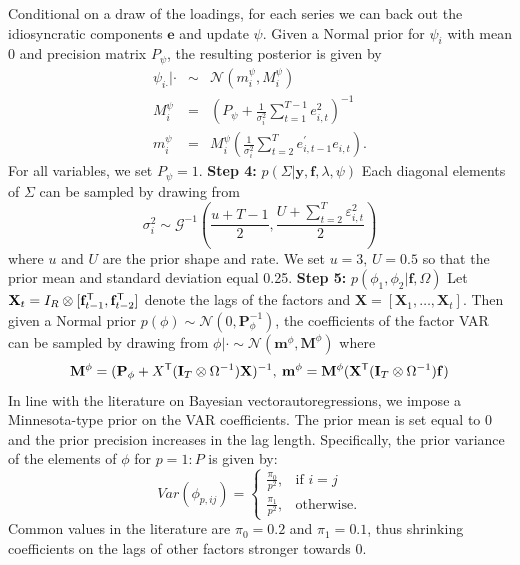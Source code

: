 \documentclass[notitlepage,a4paper,12pt]{article}
\begin{document}
\begin{ThreePartTable}
\newline       
 Conditional on a draw of the loadings, for each series we can back out the idiosyncratic components $\mathbf{e}$ and update $\psi$. Given a Normal prior for $\psi_i$ with mean 0 and precision matrix $P_{\psi}$, the resulting posterior is given by 
    \begin{eqnarray}\label{eq:posterior_psi}
        \psi_{i \boldsymbol{\cdot} } | \cdot &\sim& \mathcal{N}\left( m^{\psi}_i,M^{\psi}_i \right) \\
        M^{\psi}_i &=& \left( P_{\psi} +  \frac{1}{\sigma^2_i} \sum\nolimits_{t=1}^{T-1} e_{i, t}^2 \right)^{-1}\\
        m^{\psi}_i &=& M^{\psi}_i \left( \frac{1}{\sigma^2_i}\sum\nolimits_{t=2}^T e_{i, t-1}^{\prime} e_{i,t} \right).
    \end{eqnarray}
For all variables, we set $P_{\psi} = 1$.
\newline
\linebreak
\textbf{Step 4:} $p(\Sigma| \mathbf{y}, \mathbf{f}, \lambda, \psi)$
\newline       
Each diagonal elements of $\Sigma$ can be sampled by drawing from 
\begin{equation*}
\sigma^2_i \sim \mathcal{G}^{-1} \left( \frac{u + T-1}{2},\frac{U + \sum_{t=2}^T \varepsilon_{i,t}^2}{2} \right)
\end{equation*}  where $u$ and $U$ are the prior shape and rate. We set $u=3, \, U = 0.5$ so that the prior mean and standard deviation equal 0.25. 
\newline
\linebreak
\textbf{Step 5:} $p(\phi_1, \phi_2| \mathbf{f}, \Omega)$
\newline  
Let $\mathbf{X}_t = I_R \otimes [\mathbf{f}^{\sf{T}}_{t-1}, \mathbf{f}^{\sf{T}}_{t-2}]$ denote the lags of the factors and $\mathbf{X} = [\mathbf{X}_1, \dots, \mathbf{X}_t]$. Then given a Normal prior $p(\phi) \sim \mathcal{N}(0, \mathbf{P}_{\phi}^{-1})$, the coefficients of the factor VAR can be sampled by drawing from $\phi | \cdot \sim \mathcal{N}(\mathbf{m}^{\phi}, \mathbf{M}^{\phi})$ where
$$
\mathbf{M}^{\phi} = (\mathbf{P}_{\phi} + X^{\sf{T}}(\mathbf{I}_T \otimes \Omega^{-1})\mathbf{X})^{-1}, \: \mathbf{m}^{\phi} = \mathbf{M}^{\phi} (\mathbf{X}^{\sf{T}} (\mathbf{I}_T \otimes \Omega^{-1})\mathbf{f})
$$
In line with the literature on Bayesian vectorautoregressions, we impose a Minnesota-type prior on the VAR coefficients. The prior mean is set equal to 0 and the prior precision increases in the lag length. Specifically, the prior variance of the elements of $\phi$ for $p = 1:P$ is given by:
\[
    Var(\phi_{p,ij}) = 
	\begin{cases}
    	\frac{\pi_0}{p^2},& \text{if } i=j\\
    	\frac{\pi_1}{p^2},& \text{otherwise.}
	\end{cases}
  \]
Common values in the literature are $\pi_0 = 0.2$ and $\pi_1=0.1$, thus shrinking coefficients on the lags of other factors stronger towards 0.
\newline   
\pagebreak
\newpage


\end{ThreePartTable}
\end{document}
